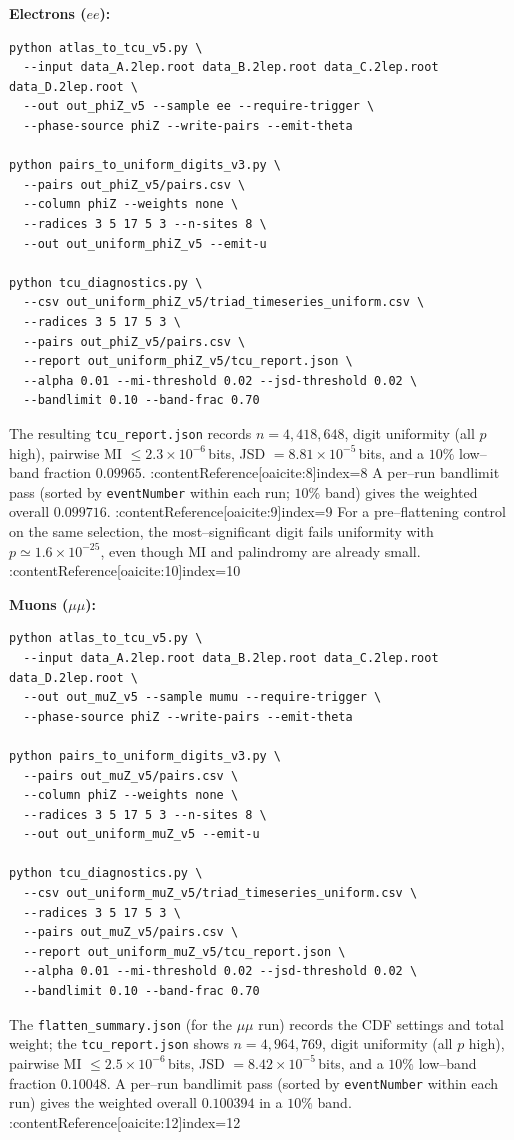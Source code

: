 \documentclass[11pt]{article}
\begin{document}
\noindent\textbf{Electrons ($ee$):}
\begin{verbatim}
python atlas_to_tcu_v5.py \
  --input data_A.2lep.root data_B.2lep.root data_C.2lep.root data_D.2lep.root \
  --out out_phiZ_v5 --sample ee --require-trigger \
  --phase-source phiZ --write-pairs --emit-theta

python pairs_to_uniform_digits_v3.py \
  --pairs out_phiZ_v5/pairs.csv \
  --column phiZ --weights none \
  --radices 3 5 17 5 3 --n-sites 8 \
  --out out_uniform_phiZ_v5 --emit-u

python tcu_diagnostics.py \
  --csv out_uniform_phiZ_v5/triad_timeseries_uniform.csv \
  --radices 3 5 17 5 3 \
  --pairs out_phiZ_v5/pairs.csv \
  --report out_uniform_phiZ_v5/tcu_report.json \
  --alpha 0.01 --mi-threshold 0.02 --jsd-threshold 0.02 \
  --bandlimit 0.10 --band-frac 0.70
\end{verbatim}
The resulting \texttt{tcu\_report.json} records $n=4{,}418{,}648$, digit uniformity (all $p$ high), pairwise MI $\le 2.3\times 10^{-6}$\,bits, JSD $=8.81\times 10^{-5}$\,bits, and a $10\%$ low–band fraction $0.09965$. :contentReference[oaicite:8]{index=8}
A per–run bandlimit pass (sorted by \texttt{eventNumber} within each run; $10\%$ band) gives the weighted overall $0.099716$. :contentReference[oaicite:9]{index=9}
For a pre–flattening control on the same selection, the most–significant digit fails uniformity with $p\simeq 1.6\times 10^{-25}$, even though MI and palindromy are already small. :contentReference[oaicite:10]{index=10}

\noindent\textbf{Muons ($\mu\mu$):}
\begin{verbatim}
python atlas_to_tcu_v5.py \
  --input data_A.2lep.root data_B.2lep.root data_C.2lep.root data_D.2lep.root \
  --out out_muZ_v5 --sample mumu --require-trigger \
  --phase-source phiZ --write-pairs --emit-theta

python pairs_to_uniform_digits_v3.py \
  --pairs out_muZ_v5/pairs.csv \
  --column phiZ --weights none \
  --radices 3 5 17 5 3 --n-sites 8 \
  --out out_uniform_muZ_v5 --emit-u

python tcu_diagnostics.py \
  --csv out_uniform_muZ_v5/triad_timeseries_uniform.csv \
  --radices 3 5 17 5 3 \
  --pairs out_muZ_v5/pairs.csv \
  --report out_uniform_muZ_v5/tcu_report.json \
  --alpha 0.01 --mi-threshold 0.02 --jsd-threshold 0.02 \
  --bandlimit 0.10 --band-frac 0.70
\end{verbatim}
The \texttt{flatten\_summary.json} (for the $\mu\mu$ run) records the CDF settings and total weight; the \texttt{tcu\_report.json} shows $n=4{,}964{,}769$, digit uniformity (all $p$ high), pairwise MI $\le 2.5\times 10^{-6}$\,bits, JSD $=8.42\times 10^{-5}$\,bits, and a $10\%$ low–band fraction $0.10048$. 
A per–run bandlimit pass (sorted by \texttt{eventNumber} within each run) gives the weighted overall $0.100394$ in a $10\%$ band. :contentReference[oaicite:12]{index=12}
\end{document}
